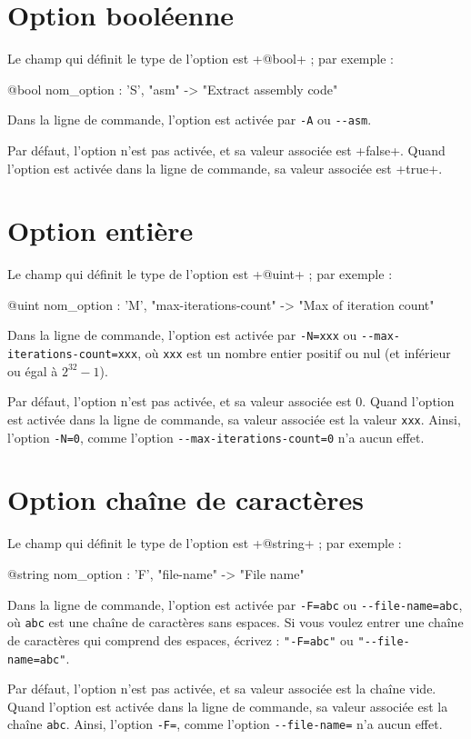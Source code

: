 \section{Option booléenne}

Le champ qui définit le type de l'option est \ggs+@bool+ ; par exemple :
\begin{galgas}
  @bool nom_option : 'S', "asm" -> "Extract assembly code"
\end{galgas}

Dans la ligne de commande, l'option est activée par \texttt{-A} ou \texttt{-{}-asm}.

Par défaut, l'option n'est pas activée, et sa valeur associée est \ggs+false+. Quand l'option est activée dans la ligne de commande, sa valeur associée est \ggs+true+.








\section{Option entière}

Le champ qui définit le type de l'option est \ggs+@uint+ ; par exemple :
\begin{galgas}
  @uint nom_option : 'M', "max-iterations-count" -> "Max of iteration count"
\end{galgas}

Dans la ligne de commande, l'option est activée par \texttt{-N=xxx} ou \texttt{-{}-max-iterations-count=xxx}, où \texttt{xxx} est un nombre entier positif ou nul (et inférieur ou égal à $2^{32}-1$).

Par défaut, l'option n'est pas activée, et sa valeur associée est $0$. Quand l'option est activée dans la ligne de commande, sa valeur associée est la valeur \texttt{xxx}. Ainsi, l'option \texttt{-N=0}, comme l'option \texttt{-{}-max-iterations-count=0} n'a aucun effet.










\section{Option chaîne de caractères}

Le champ qui définit le type de l'option est \ggs+@string+ ; par exemple :
\begin{galgas}
  @string nom_option : 'F', "file-name" -> "File name"
\end{galgas}

Dans la ligne de commande, l'option est activée par \texttt{-F=abc} ou \texttt{-{}-file-name=abc}, où \texttt{abc} est une chaîne de caractères sans espaces. Si vous voulez entrer une chaîne de caractères qui comprend des espaces, écrivez : \texttt{"-F=abc"} ou \texttt{"-{}-file-name=abc"}.

Par défaut, l'option n'est pas activée, et sa valeur associée est la chaîne vide. Quand l'option est activée dans la ligne de commande, sa valeur associée est la chaîne \texttt{abc}. Ainsi, l'option \texttt{-F=}, comme l'option \texttt{-{}-file-name=} n'a aucun effet.


